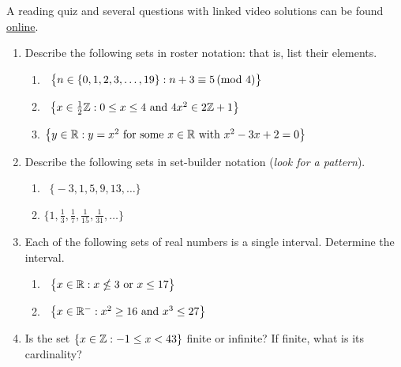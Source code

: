 \begin{exercises}{}{}
	A reading quiz and several questions with linked video solutions can be found \href{http://www.math.uci.edu/~ndonalds/math13/selftest/4-1-subset.html}{online}.

	\begin{enumerate}
	  \item Describe the following sets in roster notation: that is, list their elements.
		\begin{enumerate}
		  \item {} \ $\bigl\{n\in\{0,1,2,3,\ldots,19\}:n+3\equiv 5\negthickspace\pmod{4}\bigr\}$
		  \setcounter{enumii}{2}
		  \item {} \ $\bigl\{x\in \frac 12\mathbb{Z}: 0\le x\le 4\text{ and }4x^2\in 2\mathbb{Z}+1\bigr\}$
		  \setcounter{enumii}{4}
		  \item $\bigl\{y\in\mathbb{R}:y=x^2\text{ for some $x\in\mathbb{R}$ with } x^2-3x+2=0\bigr\}$
		\end{enumerate}
			
			
		\item Describe the following sets in set-builder notation (\emph{look for a pattern}).
		\begin{enumerate}
		  \item {} \ $\bigl\{-3,1,5,9,13,\ldots\bigr\}$
		  \setcounter{enumii}{2}
		  \item $\bigl\{1,\frac 13,\frac 17,\frac 1{15},\frac 1{31},\ldots\bigr\}$
		\end{enumerate}
		  
	
	  \item Each of the following sets of real numbers is a single interval. Determine the interval.
		\begin{enumerate}
		  \item {} \ $\bigl\{x\in\mathbb{R}:x\nleq 3\text{ or }x\le 17\bigr\}$
		  \setcounter{enumii}{2}
		  \item {} \ $\bigl\{x\in\mathbb{R}^-:x^2\ge 16\text{ and }x^3\le 27\bigr\}$
		\end{enumerate}
			
			
		\item Is the set $\{x\in\mathbb{Z}:-1\le x<43\}$ finite or infinite? If finite, what is its cardinality?
				

\end{enumerate}
\end{exercises}
